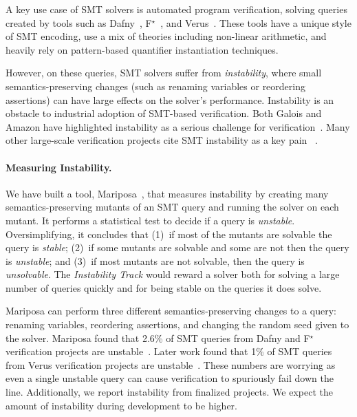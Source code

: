 \documentclass[
]{ceurart}
\newcommand{\fstar}{F${}^\star$\xspace}
\begin{document}
A key use case of SMT solvers is automated program verification, solving queries
created by tools such as Dafny~\cite{dafny}, \fstar~\cite{fstar}, and Verus~\cite{verus-ghost}. These tools
have a unique style of SMT encoding, use a mix of theories including non-linear
arithmetic, and heavily rely on pattern-based quantifier instantiation
techniques.

However, on these queries, SMT solvers suffer from \emph{instability}, where
small semantics-preserving changes (such as renaming variables or reordering
assertions) can have large effects on the solver's performance. Instability is
an obstacle to industrial adoption of SMT-based verification. Both Galois and
Amazon have highlighted instability as a serious challenge for
verification~\cite{saw-stable,amazon-billion-queries}. Many other large-scale
verification projects cite SMT instability as a key pain
~\cite{Zelkova,amazon-cloudscale,cedar,komodo,ironclad,verus-sys,starmalloc}.


\paragraph{Measuring Instability.} We have built a tool,
Mariposa~\cite{mariposa}, that measures instability by creating many
semantics-preserving mutants of an SMT query and running the solver on each
mutant. It performs a statistical test to decide if a query is \emph{unstable}.
Oversimplifying, it concludes that (1)~if most of the mutants are solvable the
query is \emph{stable}; (2)~if some mutants are solvable and some are not then
the query is \emph{unstable}; and (3)~if most mutants are not solvable, then the
query is \emph{unsolvable}. The \emph{Instability Track} would reward a solver
both for solving a large number of queries quickly and for being stable on the
queries it does solve.

Mariposa can perform three different semantics-preserving changes to a query: renaming variables, reordering assertions, and changing the random seed given to the solver. Mariposa found that 2.6\% of SMT queries from Dafny and \fstar verification projects are unstable~\cite{mariposa}. Later work found that 1\% of SMT queries from Verus verification projects are unstable~\cite{cazamariposas}. These numbers are worrying as even a single unstable query can cause verification to spuriously fail down the line. Additionally, we report instability from finalized projects. We expect the amount of instability during development to be higher.
\end{document}
